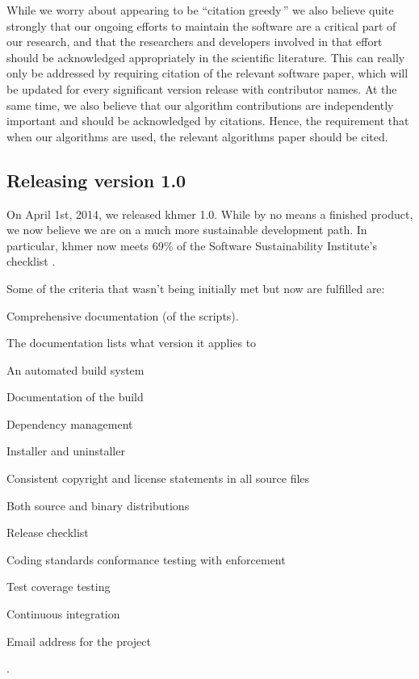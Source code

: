 \documentclass[12pt]{article}
\begin{document}
While we worry about appearing to be ``citation greedy\,'' we also
believe quite strongly that our ongoing efforts to maintain the
software are a critical part of our research, and that the researchers
and developers involved in that effort should be acknowledged
appropriately in the scientific literature.  This can really only be
addressed by requiring citation of the relevant software paper, which
will be updated for every significant version release with contributor
names.  At the same time, we also believe that our algorithm
contributions are independently important and should be acknowledged
by citations.  Hence, the requirement that when our algorithms are
used, the relevant algorithms paper should be cited.

\subsection{Releasing version 1.0}

On April 1st, 2014, we released khmer 1.0.  While by no means a
finished product, we now believe we are on a much more sustainable
development path.  In particular, khmer now meets 69\% of the Software
Sustainability Institute's checklist \cite{khmer-1.0-assessment}.

Some of the criteria that wasn't being initially met but now are fulfilled are:
\begin{inparaenum}[(A)] \item Comprehensive documentation (of the scripts).
  \item The documentation lists what version it applies to \item An automated
  build system \item Documentation of the build \item Dependency management \item
  Installer and uninstaller \item Consistent copyright and license statements
  in all source files \item Both source and binary distributions \item Release
  checklist \item Coding standards conformance testing with enforcement \item
  Test coverage testing \item Continuous integration \item Email address for
  the project \end{inparaenum}.
\end{document}
